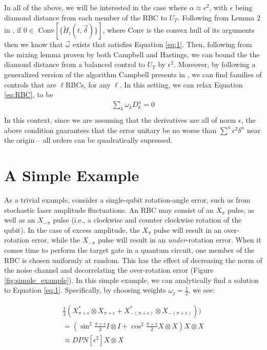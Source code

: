 \documentclass[aps,nofootinbib,pra,notitlepage,twocolumn]{revtex4-1}
\begin{document}
In all of the above, we will be interested in the case where $\alpha \approx \epsilon^2$, with $\epsilon$ being diamond distance from each member of the RBC to $U_T$. Following from Lemma 2 in \cite{Campbell2017}, if $0\in $ Conv$[\{\tilde{H}_i(t, \vec{\delta})\}]$, where Conv is the convex hull of its arguments then we know that $\vec{\omega}$ exists that satisfies Equation \ref{eq:1}. Then, following from the mixing lemma proven by both Campbell and Hastings\cite{1612.01011}, we can bound the the diamond distance from a balanced control to $U_T$ by $\epsilon^2$. Moreover, by following a generalized version of the algorithm Campbell presents in \cite{Campbell2017}, we can find families of controls that are $\ell$RBCs, for any $\ell$. In this setting, we can relax Equation \ref{eq:RBC}, to be
\begin{equation}\label{eq:RBC-relaxed}
\begin{gathered}
\sum_k\omega_kD^n_k = 0\\
\end{gathered}
\end{equation}
In this context, since we are assuming that the derivatives are all of norm $\epsilon$, the above condition guarantees that the error unitary be no worse than $\sum^n\epsilon^2\delta^n$ near the origin -- all orders can be quadratically supressed.
\section{A Simple Example}
As a trivial example, consider a single-qubit rotation-angle error, such as from stochastic laser amplitude fluctuations. An RBC may consist of an $X_\pi$ pulse, as well as an $X_{-\pi}$ pulse (i.e., a clockwise and counter clockwise rotation of the qubit). In the case of excess amplitude, the $X_\pi$ pulse will result in an over-rotation error, while the $X_{-\pi}$ pulse will result in an \emph{under}-rotation error. When it comes time to perform the target gate in a quantum circuit, one member of the RBC is chosen uniformly at random. This has the effect of decreasing the norm of the noise channel and decorrelating the over-rotation error (Figure \ref{fig:simple_example}). In this simple example, we can analytically find a solution to Equation \ref{eq:1}. Specifically, by choosing weights $\omega_j=\frac{1}{2}$, we see:

\begin{equation}
  \begin{gathered}
    \frac{1}{2}(X^*_{\pi + \epsilon}\otimes X_{\pi + \epsilon} + X^*_{-(\pi + \epsilon)}\otimes X_{-(\pi + \epsilon)})) \\
    = (\sin^2{\frac{\pi + \epsilon}{2}}I\otimes I + \cos^2{\frac{\pi + \epsilon}{2}}X\otimes X)X\otimes X \\
    \approx DPN[\epsilon^2]X\otimes X
  \end{gathered}
\end{equation}
\end{document}
